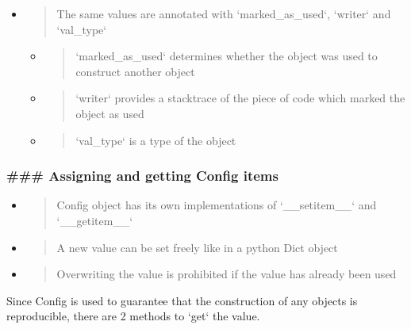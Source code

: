 \documentclass[11pt, reqno]{amsart}
\begin{document}
\begin{itemize}
\item
  \begin{quote}
  The same values are annotated with `marked\_as\_used`, `writer` and
  `val\_type`
  \end{quote}

  \begin{itemize}
  \item
    \begin{quote}
    `marked\_as\_used` determines whether the object was used to
    construct another object
    \end{quote}
  \item
    \begin{quote}
    `writer` provides a stacktrace of the piece of code which marked the
    object as used
    \end{quote}
  \item
    \begin{quote}
    `val\_type` is a type of the object
    \end{quote}
  \end{itemize}
\end{itemize}

\hypertarget{assigning-and-getting-config-items}{%
\subsubsection{\#\#\# Assigning and getting Config
items}\label{assigning-and-getting-config-items}}

\begin{itemize}
\item
  \begin{quote}
  Config object has its own implementations of `\_\_setitem\_\_` and
  `\_\_getitem\_\_`
  \end{quote}
\item
  \begin{quote}
  A new value can be set freely like in a python Dict object
  \end{quote}
\item
  \begin{quote}
  Overwriting the value is prohibited if the value has already been used
  \end{quote}
\end{itemize}

Since Config is used to guarantee that the construction of any objects
is reproducible, there are 2 methods to `get` the value.
\end{document}
